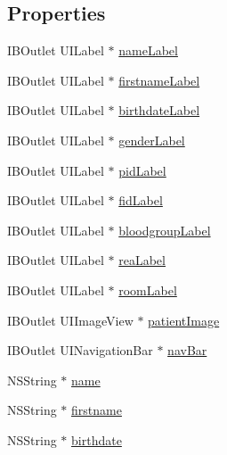 \subsection*{Properties}
\begin{DoxyCompactItemize}
\item 
I\+B\+Outlet U\+I\+Label $\ast$ \hyperlink{interface_patient_view_controller_a39c15f31779257705df01c2108c0aba9}{name\+Label}
\item 
I\+B\+Outlet U\+I\+Label $\ast$ \hyperlink{interface_patient_view_controller_a4cfee9bd7ee50cc6f1837832ffbd7910}{firstname\+Label}
\item 
I\+B\+Outlet U\+I\+Label $\ast$ \hyperlink{interface_patient_view_controller_afb8b6e7afb55140211ff94a97fd064ad}{birthdate\+Label}
\item 
I\+B\+Outlet U\+I\+Label $\ast$ \hyperlink{interface_patient_view_controller_ad0d981f3b1c2cb2851446cfabcd0032a}{gender\+Label}
\item 
I\+B\+Outlet U\+I\+Label $\ast$ \hyperlink{interface_patient_view_controller_a06ae3f2d4e7fe45821e2aa9661df2b55}{pid\+Label}
\item 
I\+B\+Outlet U\+I\+Label $\ast$ \hyperlink{interface_patient_view_controller_a1e8d7e3299ef981d7bb3fb5f82ef26c7}{fid\+Label}
\item 
I\+B\+Outlet U\+I\+Label $\ast$ \hyperlink{interface_patient_view_controller_ace000e14f7a33a1b3045f56d5f651f6c}{bloodgroup\+Label}
\item 
I\+B\+Outlet U\+I\+Label $\ast$ \hyperlink{interface_patient_view_controller_a451dd98cd605789070aca8c1b0b2e2d0}{rea\+Label}
\item 
I\+B\+Outlet U\+I\+Label $\ast$ \hyperlink{interface_patient_view_controller_afcfbf27fbe036c62012b45542f20b9c3}{room\+Label}
\item 
I\+B\+Outlet U\+I\+Image\+View $\ast$ \hyperlink{interface_patient_view_controller_a72f355ee819e7c30173bcb87ca9986aa}{patient\+Image}
\item 
I\+B\+Outlet U\+I\+Navigation\+Bar $\ast$ \hyperlink{interface_patient_view_controller_a4a621d64e3466fb134d27ade4e4c0040}{nav\+Bar}
\item 
N\+S\+String $\ast$ \hyperlink{interface_patient_view_controller_a5b5ce0c7b6ee9dfc07a360bcfd6d0292}{name}
\item 
N\+S\+String $\ast$ \hyperlink{interface_patient_view_controller_a222aa081edbb7f93c0fa4ebe327197c2}{firstname}
\item 
N\+S\+String $\ast$ \hyperlink{interface_patient_view_controller_acc02aaafd8297ae7e0528df2f7681c7d}{birthdate}

\end{DoxyCompactItemize}
